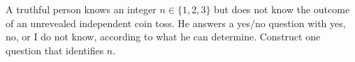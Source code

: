 A truthful person knows an integer $n\in\{1,2,3\}$ but does not know the outcome of an unrevealed independent coin toss. He answers a yes/no question with yes, no, or I do not know, according to what he can determine. Construct one question that identifies $n$.
